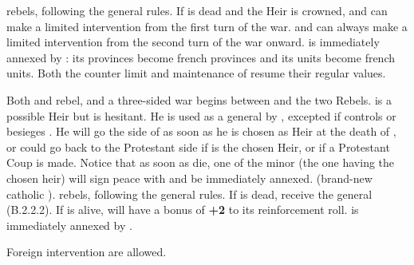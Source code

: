 \begin{digressions}

  \phevnt
  \aparag \hug rebels, following the general rules.
  \aparag If  is dead and the Heir is crowned, \HUG and
  \HOL can make a limited intervention from the first turn of the war.
  \aparag \HUG and \HOL can always make a limited intervention from the second
  turn of the war onward.
  \aparag \lig is immediately annexed by \FRA: its provinces become french
  provinces and its units become french units. Both the counter limit and
  maintenance of \FRA resume their regular values.



  \phevnt
  \bparag Both \lig and \hug rebel, and a three-sided war begins between \FRA
  and the two Rebels.
  \bparag \leaderNavarre is a possible Heir but is hesitant.  He is used as a
  general by \FRA, excepted if \hug controls or besieges .  He
  will go the side of \FRA as soon as he is chosen as Heir at the death of
  , or could go back to the Protestant side if
   is the chosen Heir, or if a Protestant Coup is
  made.
  \aparag Notice that as soon as  die, one of the minor
  (the one having the chosen heir) will sign peace with \FRA and be
  immediately annexed.
   (brand-new catholic ).
  \bparag \lig rebels, following the general rules.
  \aparag If  is dead, \lig receive the general
  \leaderMayenne (B.2.2.2).
  \aparag If  is alive, \lig will have a bonus of {\bf
    +2} to its reinforcement roll.
  \aparag \hug is immediately annexed by \FRA.
\end{digressions}

\phdipl
\aparag Foreign intervention are allowed.


